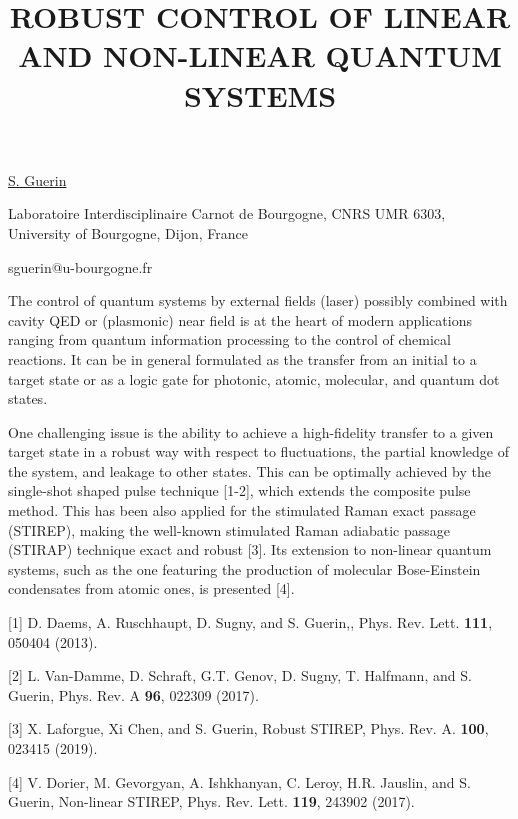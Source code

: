 \title{ROBUST CONTROL OF LINEAR AND NON-LINEAR QUANTUM SYSTEMS}

\underline{S. Guerin} 

{\normalsize{\vspace{-4mm}
Laboratoire Interdisciplinaire Carnot de Bourgogne, CNRS UMR 6303, University of Bourgogne, Dijon, France 



\email sguerin@u-bourgogne.fr}}

The control of quantum systems by external fields (laser) possibly combined with cavity QED or (plasmonic) near field is at the heart of modern applications ranging from quantum information processing to the control of chemical reactions.  It can be in general formulated as the transfer from an initial to a target state or as a logic gate for photonic, atomic, molecular, and quantum dot states.

One challenging issue is the ability to achieve a high-fidelity transfer to a given target state in a robust way with respect to fluctuations, the partial knowledge of the system, and leakage to other states. This can be optimally achieved by the single-shot shaped pulse technique [1-2], which extends the composite pulse method. This has been also applied for the stimulated Raman exact passage (STIREP), making the well-known stimulated Raman adiabatic passage (STIRAP) technique exact and robust [3].
Its extension to non-linear quantum systems, such as the one featuring the production of molecular Bose-Einstein condensates from atomic ones, is presented [4].


{\normalsize
[1] D. Daems, A. Ruschhaupt, D. Sugny, and S. Guerin,, Phys. Rev. Lett. \textbf{111}, 050404 (2013).
\vsp

[2] L. Van-Damme, D. Schraft, G.T. Genov, D. Sugny, T. Halfmann, and S. Guerin, Phys. Rev. A \textbf{96}, 022309 (2017).
\vsp

[3] X. Laforgue, Xi Chen, and S. Guerin, Robust STIREP, Phys. Rev. A. \textbf{100}, 023415 (2019).
\vsp

[4] V. Dorier, M. Gevorgyan, A. Ishkhanyan, C. Leroy, H.R. Jauslin, and S. Guerin, Non-linear STIREP, Phys. Rev. Lett. \textbf{119}, 243902 (2017).
}

\vspace{\baselineskip}